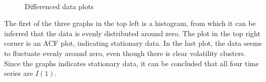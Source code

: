 \begin{figure}[H]
  \centering
  \quad
  \\
  \quad
  \caption{Differenced data plots}
\end{figure}
\noindent The first of the three graphs in the top left is a histogram, from which it can be inferred that the data is evenly distributed around zero. The plot in the top right corner is an ACF plot, indicating stationary data. In the last plot, the data seems to fluctuate evenly around zero, even though there is clear volatility clusters. 
Since the graphs indicates stationary data, it can be concluded that all four time series are $I(1)$.\\

